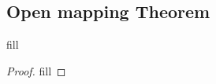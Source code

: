 \subsection{Open mapping Theorem}

\begin{exercise}{1}
fill
\end{exercise}
\begin{proof}
fill
\end{proof}